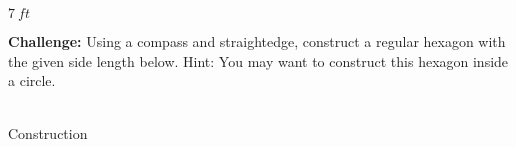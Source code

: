 \begin{exercises}
\begin{ex}
	\begin{sol}
	$7~ft$
	\end{sol}
	\end{ex}
	
	\bigskip
	
	\begin{ex}  \textbf{Challenge:  }Using a compass and straightedge, construct a regular hexagon with the given side length below.  Hint:  You may want to construct this hexagon inside a circle.\\\\

\begin{center}
\end{center}

\vfill
	
	\begin{sol}
	Construction
	\end{sol}
	\end{ex}
	
\end{exercises}	